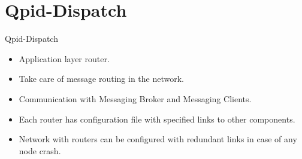 \documentclass[hyperref={pdfpagelabels=false, unicode},pdf,slideColor,fyma,9pt]{beamer}
\begin{document}
		\section{Qpid-Dispatch}
		\begin{frame}{Qpid-Dispatch}
				\begin{itemize}
						\setlength\itemsep{0.5em}
						\item Application layer router. 
						\item Take care of message routing in the network.
						\item Communication with Messaging Broker and Messaging Clients.		
						\item Each router has configuration file with specified links to other components.
						\item Network with routers can be configured with redundant links in case of any node crash.
				\end{itemize}						
		\end{frame}
\end{document}
